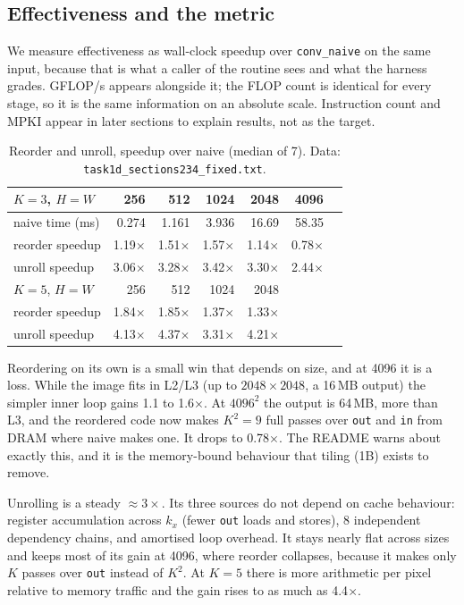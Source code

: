 \documentclass[11pt,a4paper]{article}
\begin{document}
\subsection{Effectiveness and the metric}

We measure effectiveness as wall-clock speedup over \texttt{conv\_naive} on the same input, because that is what a caller of the routine sees and what the harness grades. GFLOP/s appears alongside it; the FLOP count is identical for every stage, so it is the same information on an absolute scale. Instruction count and MPKI appear in later sections to explain results, not as the target.

\begin{table}[H]
\centering\small
\caption{Reorder and unroll, speedup over naive (median of 7). Data: \texttt{task1d\_sections234\_fixed.txt}.}
\begin{tabular}{lrrrrrr}
\toprule
$K=3$, $H=W$ & 256 & 512 & 1024 & 2048 & 4096 \\
\midrule
naive time (ms)      & 0.274 & 1.161 & 3.936 & 16.69 & 58.35 \\
reorder speedup      & 1.19$\times$ & 1.51$\times$ & 1.57$\times$ & 1.14$\times$ & 0.78$\times$ \\
unroll speedup       & 3.06$\times$ & 3.28$\times$ & 3.42$\times$ & 3.30$\times$ & 2.44$\times$ \\
\midrule
$K=5$, $H=W$ & 256 & 512 & 1024 & 2048 & \\
\midrule
reorder speedup      & 1.84$\times$ & 1.85$\times$ & 1.37$\times$ & 1.33$\times$ & \\
unroll speedup       & 4.13$\times$ & 4.37$\times$ & 3.31$\times$ & 4.21$\times$ & \\
\bottomrule
\end{tabular}
\end{table}

Reordering on its own is a small win that depends on size, and at 4096 it is a loss. While the image fits in L2/L3 (up to $2048\times2048$, a 16\,MB output) the simpler inner loop gains 1.1 to 1.6$\times$. At $4096^2$ the output is 64\,MB, more than L3, and the reordered code now makes $K^2=9$ full passes over \texttt{out} and \texttt{in} from DRAM where naive makes one. It drops to 0.78$\times$. The README warns about exactly this, and it is the memory-bound behaviour that tiling (1B) exists to remove.

Unrolling is a steady $\approx3\times$. Its three sources do not depend on cache behaviour: register accumulation across $k_x$ (fewer \texttt{out} loads and stores), 8 independent dependency chains, and amortised loop overhead. It stays nearly flat across sizes and keeps most of its gain at 4096, where reorder collapses, because it makes only $K$ passes over \texttt{out} instead of $K^2$. At $K=5$ there is more arithmetic per pixel relative to memory traffic and the gain rises to as much as 4.4$\times$.
\end{document}
